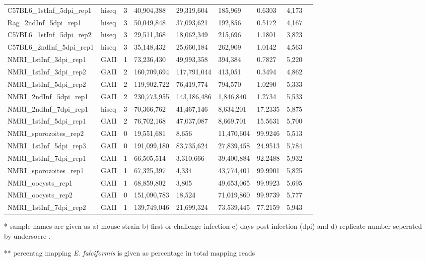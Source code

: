 \documentclass{bmcart}
\begin{document}
\begin{backmatter}
\begin{table}[ht]
\begin{tabular}{lllllllll}
  C57BL6\_1stInf\_5dpi\_rep1 & hiseq & 3 & 40,904,388 & 29,319,604 & 185,969 & 0.6303 & 4,173 \\ 
  Rag\_2ndInf\_5dpi\_rep1 & hiseq & 3 & 50,049,848 & 37,093,621 & 192,856 & 0.5172 & 4,167 \\ 
  C57BL6\_1stInf\_5dpi\_rep2 & hiseq & 3 & 29,511,368 & 18,062,349 & 215,696 & 1.1801 & 3,823 \\ 
  C57BL6\_2ndInf\_5dpi\_rep1 & hiseq & 3 & 35,148,432 & 25,660,184 & 262,909 & 1.0142 & 4,563 \\ 
  NMRI\_1stInf\_3dpi\_rep1 & GAII & 1 & 73,236,430 & 49,993,358 & 394,384 & 0.7827 & 5,220 \\ 
  NMRI\_1stInf\_3dpi\_rep2 & GAII & 2 & 160,709,694 & 117,791,044 & 413,051 & 0.3494 & 4,862 \\ 
  NMRI\_1stInf\_5dpi\_rep2 & GAII & 2 & 119,902,722 & 76,419,774 & 794,570 & 1.0290 & 5,333 \\ 
  NMRI\_2ndInf\_5dpi\_rep1 & GAII & 2 & 230,773,955 & 143,186,486 & 1,846,840 & 1.2734 & 5,533 \\ 
  NMRI\_2ndInf\_7dpi\_rep1 & hiseq & 3 & 70,366,762 & 41,467,146 & 8,634,201 & 17.2335 & 5,875 \\ 
  NMRI\_1stInf\_5dpi\_rep1 & GAII & 2 & 76,702,168 & 47,037,087 & 8,669,701 & 15.5631 & 5,700 \\ 
  NMRI\_sporozoites\_rep2 & GAII & 0 & 19,551,681 & 8,656 & 11,470,604 & 99.9246 & 5,513 \\ 
  NMRI\_1stInf\_5dpi\_rep3 & GAII & 0 & 191,099,180 & 83,735,624 & 27,839,458 & 24.9513 & 5,784 \\ 
  NMRI\_1stInf\_7dpi\_rep1 & GAII & 1 & 66,505,514 & 3,310,666 & 39,400,884 & 92.2488 & 5,932 \\ 
  NMRI\_sporozoites\_rep1 & GAII & 1 & 67,325,397 & 4,334 & 43,774,401 & 99.9901 & 5,825 \\ 
  NMRI\_oocysts\_rep1 & GAII & 1 & 68,859,802 & 3,805 & 49,653,065 & 99.9923 & 5,695 \\ 
  NMRI\_oocysts\_rep2 & GAII & 0 & 151,090,783 & 18,524 & 71,019,860 & 99.9739 & 5,777 \\ 
  NMRI\_1stInf\_7dpi\_rep2 & GAII & 1 & 139,749,046 & 21,699,324 & 73,539,445 & 77.2159 & 5,943 \\ 
   \hline
\end{tabular}
\begin{tablenotes}[flushleft]\footnotesize \singlespacing
\item{*} sample names are given as a$)$ mouse strain b$)$ first or challenge
  infection c$)$ days post infection (dpi) and d$)$ replicate number
  seperated by undersocre . \\
\item{**} percentag mapping \textit{E. falciformis} is given as percentage in total mapping reads
\end{tablenotes}
\end{table}
\hspace*{+2.5cm}






\end{backmatter}
\end{document}

